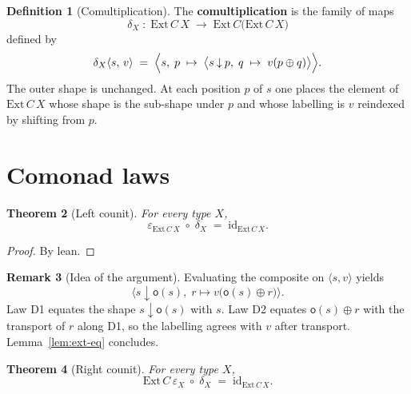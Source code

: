 \documentclass[11pt,a4paper]{article}
\theoremstyle{plain}
\newtheorem{theorem}{Theorem}[section]
\theoremstyle{definition}
\newtheorem{definition}[theorem]{Definition}
\newtheorem{remark}[theorem]{Remark}
\newcommand{\Ext}{\mathrm{Ext}}
\newcommand{\id}{\mathrm{id}}
\newcommand{\rootpos}{\mathsf{o}}
\newcommand{\sub}{\mathbin{\downarrow}}
\newcommand{\shift}{\oplus}
\begin{document}
\begin{definition}[Comultiplication]\label{def:comult}
The \textbf{comultiplication} is the family of maps
\begin{equation}
  \delta_X \;:\;
  \Ext\,C\,X \;\longrightarrow\; \Ext\,C\bigl(\Ext\,C\,X\bigr)
\end{equation}
defined by
\begin{equation}
  \delta_X\langle s,\,v\rangle
  \;=\;
  \Bigl\langle
    s,\;
    p \;\mapsto\;
    \bigl\langle
      s\sub p,\;
      q \;\mapsto\; v(p\shift q)
    \bigr\rangle
  \Bigr\rangle.
\end{equation}
The outer shape is unchanged. At each position $p$ of $s$ one places the
element of $\Ext\,C\,X$ whose shape is the sub-shape under $p$ and whose
labelling is $v$ reindexed by shifting from $p$.
\end{definition}

\section{Comonad laws}

\begin{theorem}[Left counit]\label{thm:left-counit}
For every type $X$,
\begin{equation}
  \varepsilon_{\Ext\,C\,X}\;\circ\;\delta_X
  \;=\;
  \id_{\Ext\,C\,X}.
\end{equation}
\end{theorem}

\begin{proof}
By lean.
\end{proof}

\begin{remark}[Idea of the argument]
Evaluating the composite on $\langle s,v\rangle$ yields
\[
  \bigl\langle
    s\sub\rootpos(s),\;
    r\mapsto v\bigl(\rootpos(s)\shift r\bigr)
  \bigr\rangle.
\]
Law D1 equates the shape $s\sub\rootpos(s)$ with $s$. Law D2 equates
$\rootpos(s)\shift r$ with the transport of $r$ along D1, so the labelling
agrees with $v$ after transport. Lemma~\ref{lem:ext-eq} concludes.
\end{remark}

\begin{theorem}[Right counit]\label{thm:right-counit}
For every type $X$,
\begin{equation}
  \Ext\,C\,\varepsilon_X\;\circ\;\delta_X
  \;=\;
  \id_{\Ext\,C\,X}.
\end{equation}
\end{theorem}
\end{document}
